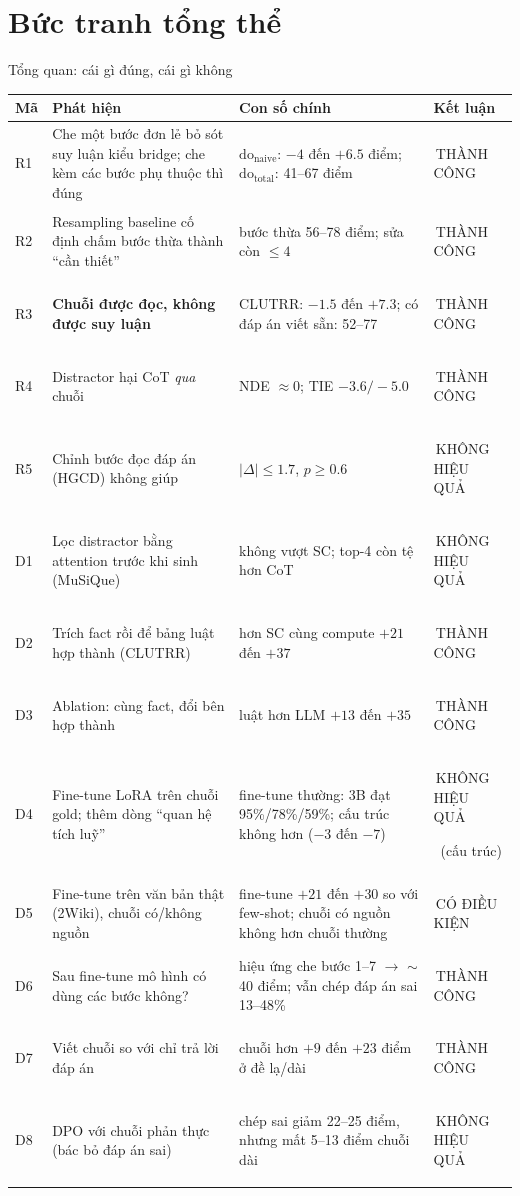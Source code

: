 \documentclass[aspectratio=169,t]{beamer}
\newcommand{\nhanS}[2]{{\setlength{\fboxsep}{0.8pt}\colorbox{#1}{\tiny\bfseries\color{white}\rule[-1.1pt]{0pt}{5.6pt}\,#2\,}}}
\newcommand{\OKs}{\nhanS{okc}{THÀNH CÔNG}}
\newcommand{\PARTs}{\nhanS{partc}{CÓ ĐIỀU KIỆN}}
\newcommand{\FAILs}{\nhanS{failc}{KHÔNG HIỆU QUẢ}}
\newcommand{\dn}{\mathrm{do}_{\text{naive}}}
\newcommand{\dt}{\mathrm{do}_{\text{total}}}
\begin{document}
\section{Bức tranh tổng thể}
\begin{frame}[shrink]{Tổng quan: cái gì đúng, cái gì không}
\scriptsize
\renewcommand{\arraystretch}{1.02}
\setlength{\tabcolsep}{3pt}
\begin{tabularx}{\textwidth}{@{}P{0.9cm}YP{3.35cm}P{2.05cm}@{}}
\toprule
\textbf{Mã} & \textbf{Phát hiện} & \textbf{Con số chính} & \textbf{Kết luận}\\
\midrule
R1 & Che một bước đơn lẻ bỏ sót suy luận kiểu bridge; che kèm các bước phụ thuộc thì đúng & $\dn$: $-4$ đến $+6.5$ điểm; $\dt$: 41--67 điểm & \OKs\\
R2 & Resampling baseline cố định chấm bước thừa thành ``cần thiết'' & bước thừa 56--78 điểm; sửa còn $\le 4$ & \OKs\\
R3 & \textbf{Chuỗi được đọc, không được suy luận} & CLUTRR: $-1.5$ đến $+7.3$; có đáp án viết sẵn: 52--77 & \OKs\\
R4 & Distractor hại CoT \emph{qua} chuỗi & NDE $\approx0$; TIE $-3.6/-5.0$ & \OKs\\
R5 & Chỉnh bước đọc đáp án (HGCD) không giúp & $|\Delta|\le1.7$, $p\ge0.6$ & \FAILs\\
\midrule
D1 & Lọc distractor bằng attention trước khi sinh (MuSiQue) & không vượt SC; top-4 còn tệ hơn CoT & \FAILs\\
D2 & Trích fact rồi để bảng luật hợp thành (CLUTRR) & hơn SC cùng compute $+21$ đến $+37$ & \OKs\\
D3 & Ablation: cùng fact, đổi bên hợp thành & luật hơn LLM $+13$ đến $+35$ & \OKs\\
D4 & Fine-tune LoRA trên chuỗi gold; thêm dòng ``quan hệ tích luỹ'' & fine-tune thường: 3B đạt 95\%/78\%/59\%; cấu trúc không hơn ($-3$ đến $-7$) & \FAILs\ (cấu trúc)\\
D5 & Fine-tune trên văn bản thật (2Wiki), chuỗi có/không nguồn & fine-tune $+21$ đến $+30$ so với few-shot; chuỗi có nguồn không hơn chuỗi thường & \PARTs\\
D6 & Sau fine-tune mô hình có dùng các bước không? & hiệu ứng che bước 1--7 $\to$ $\sim$40 điểm; vẫn chép đáp án sai 13--48\% & \OKs\\
D7 & Viết chuỗi so với chỉ trả lời đáp án & chuỗi hơn $+9$ đến $+23$ điểm ở đề lạ/dài & \OKs\\
D8 & DPO với chuỗi phản thực (bác bỏ đáp án sai) & chép sai giảm 22--25 điểm, nhưng mất 5--13 điểm chuỗi dài & \FAILs\\

\end{tabularx}
\end{frame}
\end{document}
